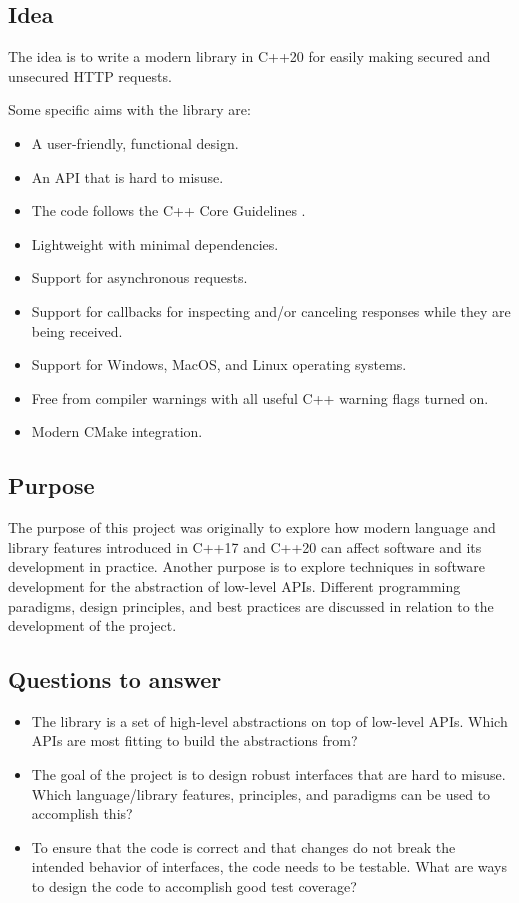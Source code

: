 \documentclass[12pt, a4paper]{article}
\begin{document}
\subsection{Idea}\label{sec:Idea}
The idea is to write a modern library in C++20 for easily making secured and unsecured HTTP requests. 

Some specific aims with the library are:
\begin{itemize}
	\item A user-friendly, functional design.
	\item An API that is hard to misuse.
	\item The code follows the C++ Core Guidelines \parencite{CppCoreGuidelines}.
	\item Lightweight with minimal dependencies.
	\item Support for asynchronous requests.
	\item Support for callbacks for inspecting and/or canceling responses while they are being received.
	\item Support for Windows, MacOS, and Linux operating systems.
	\item Free from compiler warnings with all useful C++ warning flags turned on.
	\item Modern CMake integration.
\end{itemize}

\subsection{Purpose}
The purpose of this project was originally to explore how modern language and library features introduced in C++17 and C++20 can affect software and its development in practice. Another purpose is to explore techniques in software development for the abstraction of low-level APIs. Different programming paradigms, design principles, and best practices are discussed in relation to the development of the project.
\subsection{Questions to answer}

\begin{itemize}
	\item The library is a set of high-level abstractions on top of low-level APIs. Which APIs are most fitting to build the abstractions from?
	\item The goal of the project is to design robust interfaces that are hard to misuse. Which language/library features, principles, and paradigms can be used to accomplish this?
	\item To ensure that the code is correct and that changes do not break the intended behavior of interfaces, the code needs to be testable. What are ways to design the code to accomplish good test coverage?
\end{itemize}
\end{document}
